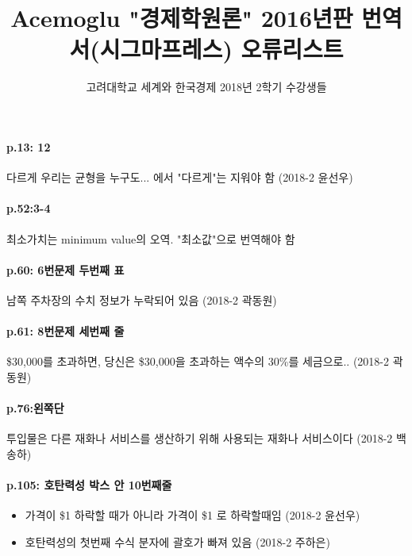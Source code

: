 \documentclass[a4paper]{article}
\author{고려대학교 세계와 한국경제 2018년 2학기 수강생들}
\title{Acemoglu "경제학원론" 2016년판 번역서(시그마프레스) 오류리스트}
\begin{document}
\maketitle
	
\paragraph{p.13: 12} %
\label{par:p_13_12}
다르게 우리는 균형을 누구도... 에서 "다르게"는 지워야 함 (2018-2 윤선우)

\paragraph{p.52:3-4} %
\label{par:p_52_3_4}
최소가치는 minimum value의 오역. "최소값"으로 번역해야 함

\paragraph{p.60: 6번문제 두번째 표} %
\label{par:p_60_6}
남쪽 주차장의 수치 정보가 누락되어 있음 (2018-2 곽동원)

\paragraph{p.61: 8번문제 세번째 줄} %
\label{par:p_61_8}
\$30,000를 초과하면, 당신은 \$30,000을 초과하는 액수의 30\%를 세금으로.. (2018-2 곽동원)

\paragraph{p.76:왼쪽단} %
\label{par:p_76_}
투입물은 다른 재화나 서비스를 생산하기 위해 사용되는 재화나 서비스이다
(2018-2 백송하)

\paragraph{p.105: 호탄력성 박스 안 10번째줄} %
\label{par:p_105_}
\begin{itemize}
	\item 가격이 \$1 하락할 때가 아니라 가격이 \$1 로 하락할때임 (2018-2 윤선우)

	\item 호탄력성의 첫번째 수식 분자에 괄호가 빠져 있음 (2018-2 주하은)
\end{itemize}
\end{document}
